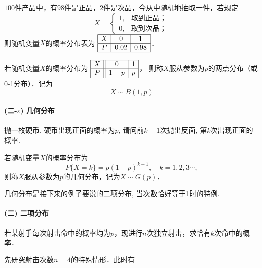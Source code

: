 \begin{example}
    $100$件产品中，有$98$件是正品，$2$件是次品，今从中随机地抽取一件，若规定
    \[X=\left\{ \begin{array}{ll} 1, & \text{取到正品；} \\
    0, &  \text{取到次品；} \end{array} \right.\]
    则随机变量$X$的概率分布表为
$\begin{array}{|c|c|c|}\hline
X & 0 & 1 \\ \hline
P & 0.02 & 0.98 \\ \hline
\end{array}$．
\end{example}

\begin{definition}[两点分布(0-1分布)]
    若随机变量$X$的概率分布为
    $\begin{array}{|c||c|c|}\hline
    X & 0 & 1 \\ \hline
    P & 1-p & p \\ \hline
    \end{array}$，
    则称$X$服从参数为$p$的两点分布（或 0-1分布）．记为$$X\sim B(1,p)$$
    \end{definition}

    \paragraph{(二-$\varepsilon$) 几何分布}

    \begin{example}
        抛一枚硬币, 硬币出现正面的概率为$p$, 请问前$k-1$次抛出反面, 第$k$次出现正面的概率. 
    \end{example}

    \begin{definition}
        若随机变量$X$的概率分布为
        \[P\{X=k\}=p(1-p)^{k-1},\quad k=1,2,3\cdots,\]
        则称$X$服从参数为$p$的几何分布，记为$X\sim G(p)$．
        \end{definition}

        几何分布是接下来的例子要说的二项分布, 当次数恰好等于1时的特例. 

    \paragraph{(二) 二项分布}

    \begin{example}
        若某射手每次射击命中的概率均为$p$，现进行$n$次独立射击，求恰有$k$次命中的概率．
        \end{example}
        \def\1{\ding{51}} %
        \def\0{\ding{55}} %
        先研究射击次数$n=4$的特殊情形．此时有


